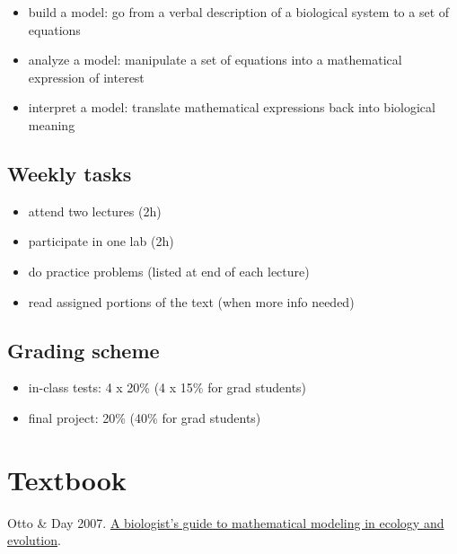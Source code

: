 \documentclass[
]{article}
\providecommand{\tightlist}{%
  \setlength{\itemsep}{0pt}\setlength{\parskip}{0pt}}
\begin{document}
\begin{itemize}
\tightlist
\item[$\textcolor{taskgreen}{\boxed{\checkmark}}$]
  build a model: go from a verbal description of a biological system to
  a set of equations
\item[$\textcolor{taskgreen}{\boxed{\checkmark}}$]
  analyze a model: manipulate a set of equations into a mathematical
  expression of interest
\item[$\textcolor{taskgreen}{\boxed{\checkmark}}$]
  interpret a model: translate mathematical expressions back into
  biological meaning
\end{itemize}

\hypertarget{weekly-tasks}{%
\subsection{Weekly tasks}\label{weekly-tasks}}

\begin{itemize}
\tightlist
\item[$\textcolor{taskgreen}{\boxed{\checkmark}}$]
  attend two lectures (2h)
\item[$\textcolor{taskgreen}{\boxed{\checkmark}}$]
  participate in one lab (2h)
\item[$\textcolor{taskgreen}{\boxed{\checkmark}}$]
  do practice problems (listed at end of each lecture)
\item[$\textcolor{taskgreen}{\boxed{\checkmark}}$]
  read assigned portions of the text (when more info needed)
\end{itemize}

\hypertarget{grading-scheme}{%
\subsection{Grading scheme}\label{grading-scheme}}

\begin{itemize}
\tightlist
\item
  in-class tests: 4 x 20\% (4 x 15\% for grad students)
\item
  final project: 20\% (40\% for grad students)
\end{itemize}

\hypertarget{textbook}{%
\section{Textbook}\label{textbook}}

Otto \& Day 2007. \href{https://www.zoology.ubc.ca/biomath/}{A
biologist's guide to mathematical modeling in ecology and evolution}.
\end{document}
